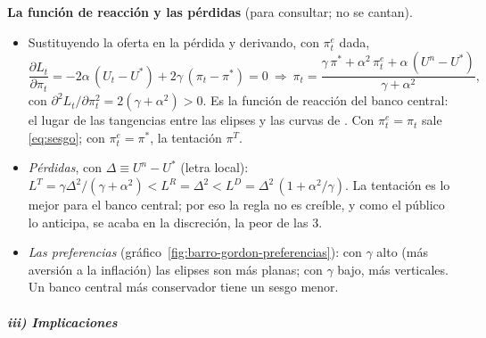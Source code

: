 \documentclass[11pt]{article}
\begin{document}
\begin{anotaciones}
\textbf{La función de reacción y las pérdidas} (para consultar; no se cantan).
\begin{itemize}
\item Sustituyendo la oferta en la pérdida y derivando, con $\pi^e_t$ dada,
  \begin{equation*}
  \frac{\partial L_t}{\partial\pi_t}=-2\alpha\,(U_t-U^*)+2\gamma\,(\pi_t-\pi^*)=0\ \Longrightarrow\ \pi_t=\frac{\gamma\,\pi^*+\alpha^2\,\pi^e_t+\alpha\,(U^n-U^*)}{\gamma+\alpha^2},
  \end{equation*}
  con $\partial^2L_t/\partial\pi_t^2=2(\gamma+\alpha^2)>0$. Es la función de reacción del banco central: el lugar de las tangencias entre las elipses y las curvas de . Con $\pi^e_t=\pi_t$ sale \eqref{eq:sesgo}; con $\pi^e_t=\pi^*$, la tentación $\pi^T$.
\item \emph{Pérdidas}, con $\Delta\equiv U^n-U^*$ (letra local): $L^T=\gamma\Delta^2/(\gamma+\alpha^2)<L^R=\Delta^2<L^D=\Delta^2\,(1+\alpha^2/\gamma)$. La tentación es lo mejor para el banco central; por eso la regla no es creíble, y como el público lo anticipa, se acaba en la discreción, la peor de las 3.\findemo
\item \emph{Las preferencias} (gráfico~\ref{fig:barro-gordon-preferencias}): con $\gamma$ alto (más aversión a la inflación) las elipses son más planas; con $\gamma$ bajo, más verticales. Un banco central más conservador tiene un sesgo menor.
\end{itemize}
\begin{figuracaja}
\caption{Las preferencias del banco central con $\gamma$ alto y con $\gamma$ bajo}\label{fig:barro-gordon-preferencias}
\end{figuracaja}
\end{anotaciones}

\subparagraph{iii) Implicaciones}
\end{document}
